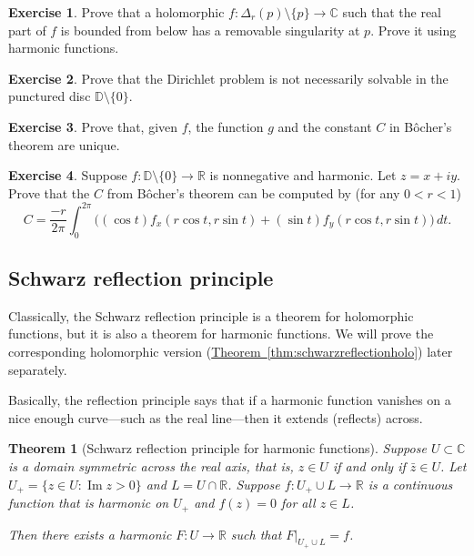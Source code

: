 \documentclass[12pt,openany]{book}
\renewcommand{\Im}{\operatorname{Im}}
\newcommand{\C}{{\mathbb{C}}}
\newcommand{\R}{{\mathbb{R}}}
\newcommand{\D}{{\mathbb{D}}}
\theoremstyle{plain}
\newtheorem{thm}{Theorem}[section]
\theoremstyle{remark}
\theoremstyle{definition}
\newenvironment{exbox}{%
    \def\FrameCommand{\vrule width 1pt \relax\hspace{10pt}}%
    \MakeFramed{\advance\hsize-\width\FrameRestore}%
}{%
    \endMakeFramed
}
\theoremstyle{exercise}
\newtheorem{exercise}{Exercise}[section]
\theoremstyle{example}
\newcommand{\thmref}[1]{\hyperref[#1]{Theorem~\ref*{#1}}}
\begin{document}
\begin{exbox}
\begin{exercise}
Prove that a holomorphic $f \colon \Delta_r(p) \setminus \{ p \} \to \C$
such that the real part of $f$ is bounded from below has a removable singularity at $p$.
Prove it using harmonic functions.
\end{exercise}

\begin{exercise} \label{exercise:nodirichletsolpuncturedD}
Prove that the Dirichlet problem is not necessarily solvable in the punctured disc $\D
\setminus \{ 0 \}$.
\end{exercise}

\begin{exercise}
Prove that, given $f$, the function $g$ and the constant $C$ in 
B\^{o}cher's theorem are unique.
\end{exercise}

\begin{exercise}
Suppose $f \colon \D \setminus \{ 0 \} \to \R$ is nonnegative and harmonic.
Let $z=x+iy$.  Prove that the $C$ from B\^{o}cher's theorem can be computed by
(for any $0 < r < 1$)
\begin{equation*}
C =  \frac{-r}{2\pi} \int_0^{2\pi}
\bigl(
(\cos t) f_x (r\cos t,r\sin t) +
(\sin t) f_y (r\cos t,r\sin t) 
\bigr) \, dt .
\end{equation*}
\end{exercise}
\end{exbox}

\subsection{Schwarz reflection principle}

Classically, the Schwarz reflection principle is a theorem for holomorphic
functions, but it is also a theorem for harmonic functions.
We will prove the corresponding holomorphic version
(\thmref{thm:schwarzreflectionholo}) later separately.

Basically, the reflection principle says that if a harmonic function vanishes on a nice enough
curve---such as the real line---then it extends (reflects) across.

\begin{thm}[Schwarz reflection principle for harmonic functions]%
%
\label{thm:schwarzreflectionharm}
Suppose $U \subset \C$ is a domain symmetric across the real axis, that is,
$z \in U$ if and only if $\bar{z} \in U$.
Let $U_+ = \{ z \in U : \Im z > 0 \}$ and $L = U \cap \R$.
Suppose $f \colon U_+ \cup L \to \R$ is a continuous function that is
harmonic on $U_+$ and $f(z) = 0$ for all $z \in L$.

Then there exists a harmonic $F \colon U \to \R$ such that
$F|_{U_+ \cup L} = f$.
\end{thm}
\end{document}
